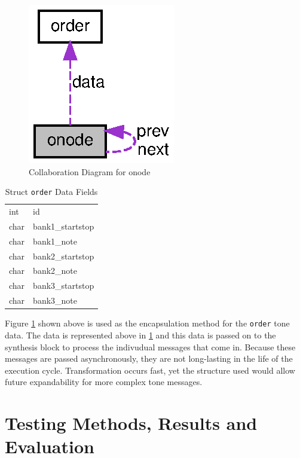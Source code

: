 \documentclass[bibtotocnumbered,abstract=on,paper=a4,fontsize=12pt,parskip=on,halfparskip=on]{scrartcl}		%
\begin{document}
    \begin{figure}[h!]
      \centering
        \includegraphics[]{img/structonode_coll_graph.eps}
        \caption{Collaboration Diagram for onode}
        \label{fig_onode}
    \end{figure}

      \begin{table}[H]
      \label{table_order}
      \small
      \centering
      \caption{Struct \texttt{order} Data Fields}
      \begin{tabularx}{0.4\textwidth}{ p{1.5cm} X }
        \hline
        int & id \\
        char & bank1\_startstop \\
        char & bank1\_note \\
        char & bank2\_startstop \\
        char & bank2\_note \\
        char & bank3\_startstop \\
        char & bank3\_note \\
        \hline
      \end{tabularx}
      \end{table}

    Figure \ref{fig_onode} shown above is used as the encapsulation method for the \texttt{order} tone data. The data is represented above in \ref{table_order} and this data is passed on to the synthesis block to process the indivudual messages that come in. Because these messages are passed asynchronously, they are not long-lasting in the life of the execution cycle. Transformation occurs fast, yet the structure used would allow future expandability for more complex tone messages.

\section{Testing Methods, Results and Evaluation}
\end{document}
